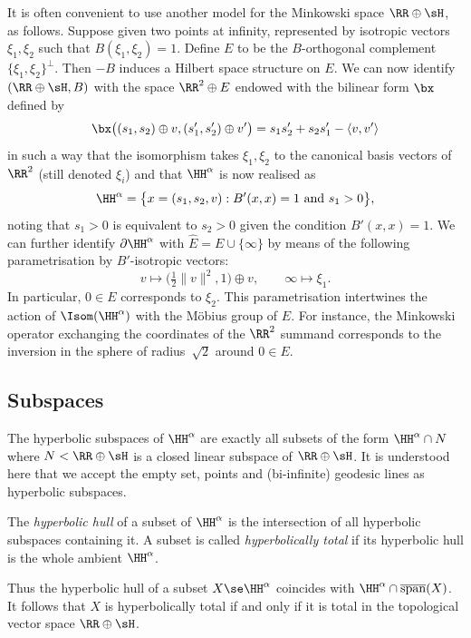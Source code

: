It is often convenient to use another model for the Minkowski space $\RR\oplus \sH$, as follows. Suppose given two points at infinity, represented by isotropic vectors $\xi_1, \xi_2$ such that $B(\xi_1, \xi_2)=1$. Define $E$ to be the $B$-orthogonal complement $\{\xi_1, \xi_2\}^\perp$. Then $-B$ induces a Hilbert space structure on $E$. We can now identify $(\RR\oplus \sH, B)$ with the space ${\RR^2\oplus E}$ endowed with the bilinear form $\bx$ defined by
\[
\bx\big((s_1,s_2)\oplus v, (s_1', s_2')\oplus v'\big)= s_1 s_2' + s_2 s_1' - \langle v,v'\rangle
\]
in such a way that the isomorphism takes $\xi_1, \xi_2$ to the canonical basis vectors of $\RR^2$ (still denoted $\xi_i$) and that $\HH^\alpha$ is now realised as
\[
\HH^\alpha=\big\{x=(s_1, s_2, v) : B'(x,x) = 1 \text{ and } s_1 > 0\big\},
\]
noting that $s_1>0$ is equivalent to $s_2>0$ given the condition ${B'(x,x) = 1}$. We can further identify $\partial \HH^\alpha$ with $\widehat E=E\cup\{\infty\}$ by means of the following parametrisation by $B'$-isotropic vectors:
\begin{equation}\label{eq:para:bord}
v \longmapsto \big(\tfrac12 \|v\|^2,1\big)\oplus v,\qquad \infty \longmapsto \xi_1.
\end{equation}
In particular, $0\in E$ corresponds to $\xi_2$. This parametrisation intertwines the action of $\Isom(\HH^\alpha)$ with the M\"obius group of $E$. For instance, the Minkowski operator exchanging the coordinates of the $\RR^2$ summand corresponds to the inversion in the sphere of radius~$\sqrt2$ around $0\in E$.

\subsection{Subspaces}\label{sec:subspace}

The hyperbolic subspaces of $\HH^\alpha$ are exactly all subsets of the form $\HH^\alpha \cap N$ where $N<\RR\oplus \sH$ is a closed linear subspace of $\RR\oplus\sH$. It is understood here that we accept the empty set, points and (bi-infinite) geodesic lines as hyperbolic subspaces.

\begin{defi}
The \emph{hyperbolic hull} of a subset of $\HH^\alpha$ is the intersection of all hyperbolic subspaces containing it. A subset is called \emph{hyperbolically total} if its hyperbolic hull is the whole ambient $\HH^\alpha$.
\end{defi}

Thus the hyperbolic hull of a subset $X\se \HH^\alpha$ coincides with $\HH^\alpha\cap\overline{\mathrm{span}}(X)$. It follows that $X$ is hyperbolically total if and only if it is total in the topological vector space $\RR\oplus \sH$.


